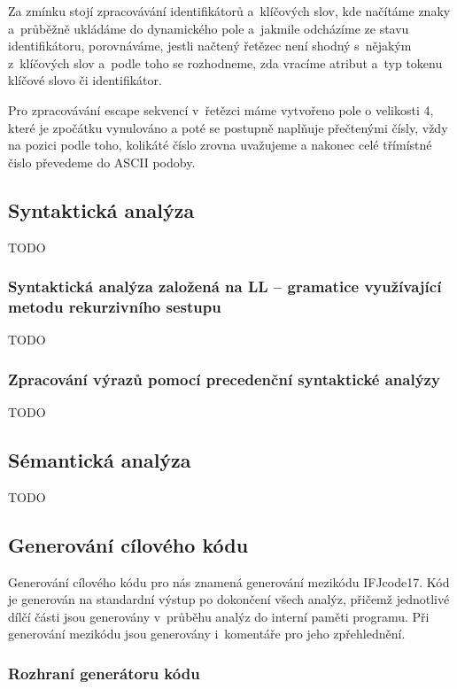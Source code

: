 \documentclass[a4paper, 11pt]{article}
\begin{document}
	Za zmínku stojí zpracovávání identifikátorů a~klíčových slov, kde načítáme znaky a~průběžně ukládáme do dynamického pole 
	a~jakmile odcházíme ze stavu identifikátoru, porovnáváme, jestli načtený řetězec není shodný s~nějakým z~klíčových slov a~podle 
	toho se rozhodneme, zda vracíme atribut a~typ tokenu klíčové slovo či identifikátor. 
	
	Pro zpracovávání escape sekvencí v~řetězci máme vytvořeno pole o velikosti 4, které je zpočátku vynulováno a poté se postupně 
	naplňuje přečtenými čísly, vždy na pozici podle toho, kolikáté číslo zrovna uvažujeme a nakonec celé třímístné čislo převedeme 
	do ASCII podoby.


	\subsection{Syntaktická analýza}

	TODO

	\subsubsection{Syntaktická analýza založená na LL -- gramatice využívající metodu rekurzivního sestupu}

	TODO

	\subsubsection{Zpracování výrazů pomocí precedenční syntaktické analýzy}

	TODO


	\subsection{Sémantická analýza}

	TODO


	\subsection{Generování cílového kódu}

	Generování cílového kódu pro nás znamená generování mezikódu IFJcode17. Kód je generován na standardní výstup
	po dokončení všech analýz, přičemž jednotlivé dílčí části jsou generovány v~průběhu analýz do interní paměti
	programu. Při generování mezikódu jsou generovány i~komentáře pro jeho zpřehlednění.

	\subsubsection{Rozhraní generátoru kódu}
\end{document}
